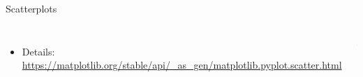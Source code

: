 \begin{frame}[fragile]{Scatterplots}
\begin{columns}[t]
\begin{itemize}
\item Details:\\
{\scriptsize\url{https://matplotlib.org/stable/api/_as_gen/matplotlib.pyplot.scatter.html}}
\end{itemize}
%
\vspace{-10pt}
\begin{tcolorbox}[title=Germany as Scatterplot]
\begin{center}
	\includegraphics[width=.8\linewidth]{./gfx/plt-de}
\end{center}
\end{tcolorbox}
\end{columns}
%
\end{frame}


